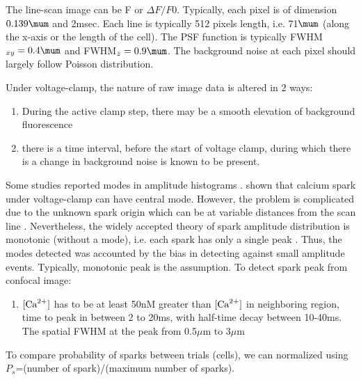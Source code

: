 The line-scan image can be F or $\Delta F/F0$. Typically, each pixel is of
dimension $0.139\mum$ and 2msec. Each line is typically 512 pixels length, i.e.
71$\mum$ (along the x-axis or the length of the cell). The PSF function is
typically FWHM$_{xy}=0.4\mum$ and FWHM$_z=0.9\mum$. The background noise at each
pixel should largely follow Poisson distribution.

\begin{framed}
Under voltage-clamp, the nature of raw image data is altered in 2 ways: 
\begin{enumerate}
  \item During the active clamp step, there may be a smooth elevation of
  background fluorescence
  \item there is a time interval, before the start of voltage clamp, during
  which there is a change in background noise is known to be present. 
\end{enumerate}
\end{framed}

Some studies reported modes in amplitude histograms \citep{tsugorka1995,
klein1996, lukyanenko1996, shirokova1997, xiao1997, satoh1997}. \citep{rios1997}
shown that calcium spark under voltage-clamp can have central mode. However, the
problem is complicated due to the unknown spark origin which can be at variable
distances from the scan line \citep{shirokova1997, smith1998}. Nevertheless, the
widely accepted theory of spark amplitude distribution is monotonic (without a
mode), i.e. each spark has only a single peak
\citep{pratusevich1996,smith1998,cheng1999}. Thus, the modes detected was
accounted by the bias in detecting against small amplitude events. Typically,
monotonic peak is the assumption. To detect spark peak from confocal image:
\begin{enumerate}
  \item $[{\text{Ca}^{2+}}]$ has to be at least 50nM  greater than $[{\text{Ca}^{2+}}]$ in neighboring
  region, time to peak in between 2 to 20ms, with half-time decay between
  10-40ms. The spatial FWHM at the peak from 0.5$\mu$m to 3$\mu$m
\end{enumerate}
To compare probability of sparks between trials (cells), we can normalized using
$P_s$=(number of spark)/(maximum number of sparks).

